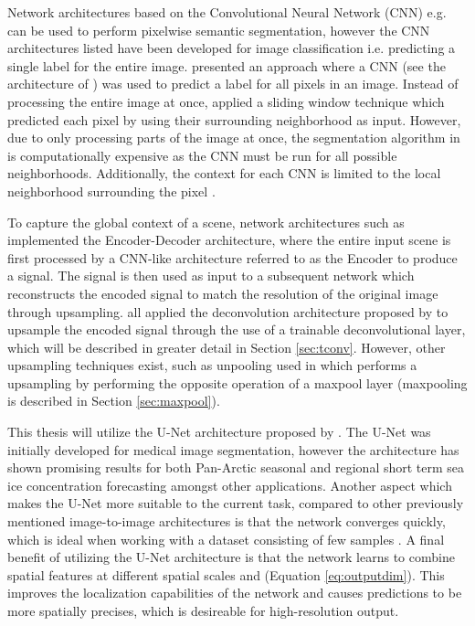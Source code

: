 \documentclass[../main/thesis.tex]{subfiles}
\begin{document}
Network architectures based on the Convolutional Neural Network (CNN) e.g. \citep{LeCun1989,Ciresan2012,Krizhevsky2012,Simonyan2014,Szegedy2014,He2015a,Huang2016} can be used to perform pixelwise semantic segmentation, however the CNN architectures listed have been developed for image classification i.e. predicting a single label for the entire image. \citet{Ciresan2012a} presented an approach where a CNN (see the architecture of \citet{Ciresan2012}) was used to predict a label for all pixels in an image. Instead of processing the entire image at once, \citet{Ciresan2012a} applied a sliding window technique which predicted each pixel by using their surrounding neighborhood as input. However, due to only processing parts of the image at once, the segmentation algorithm in \citet{Ciresan2012a} is computationally expensive as the CNN must be run for all possible neighborhoods. Additionally, the context for each CNN is limited to the local neighborhood surrounding the pixel \citep{Ronneberger2015}.

To capture the global context of a scene, network architectures such as \citet{Long2015,Noh2015,Ronneberger2015,Badrinarayanan2017,Chen2018} implemented the Encoder-Decoder architecture, where the entire input scene is first processed by a CNN-like architecture referred to as the Encoder to produce a signal. The signal is then used as input to a subsequent network which reconstructs the encoded signal to match the resolution of the original image through upsampling. \citet{Long2015,Ronneberger2015,Badrinarayanan2017} all applied the deconvolution architecture proposed by \citet{Zeiler2010} to upsample the encoded signal through the use of a trainable deconvolutional layer, which will be described in greater detail in Section \ref{sec:tconv}. However, other upsampling techniques exist, such as unpooling used in \citet{Noh2015} which performs a upsampling by performing the opposite operation of a maxpool layer (maxpooling is described in Section \ref{sec:maxpool}).

This thesis will utilize the U-Net architecture proposed by \citet{Ronneberger2015}. The U-Net was initially developed for medical image segmentation, however the architecture has shown promising results for both Pan-Arctic seasonal \citep{Andersson2021} and regional short term \citep{Grigoryev2022} sea ice concentration forecasting amongst other applications. Another aspect which makes the U-Net more suitable to the current task, compared to other previously mentioned image-to-image architectures is that the network converges quickly, which is ideal when working with a dataset consisting of few samples \citep{Ronneberger2015}. A final benefit of utilizing the U-Net architecture is that the network learns to combine spatial features at different spatial scales \citep{Ronneberger2015} and (Equation \ref{eq:outputdim}). This improves the localization capabilities of the network and causes predictions to be more spatially precises, which is desireable for high-resolution output.
\end{document}
